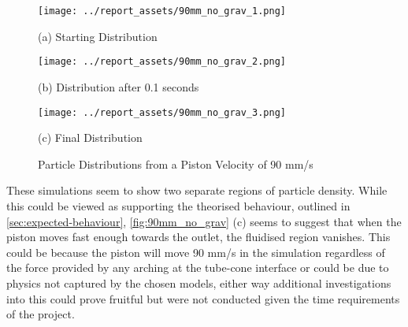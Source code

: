 \begin{figure}[htbp]
    \centering

    \begin{minipage}{0.32\textwidth}
        \centering
        \texttt{[image: ../report\_assets/90mm\_no\_grav\_1.png]}
        \caption*{(a) Starting Distribution}
    \end{minipage}
    \hfill
    \begin{minipage}{0.32\textwidth}
        \centering
        \texttt{[image: ../report\_assets/90mm\_no\_grav\_2.png]}
        \caption*{(b) Distribution after 0.1 seconds}
    \end{minipage}
    \hfill
    \begin{minipage}{0.32\textwidth}
        \centering
        \texttt{[image: ../report\_assets/90mm\_no\_grav\_3.png]}
        \caption*{(c) Final Distribution}
    \end{minipage}
    \caption{Particle Distributions from a Piston Velocity of 90 mm/s}

\end{figure}\label{fig:90mm_no_grav}
These simulations seem to show two separate regions of particle density. While this could be viewed as supporting the theorised behaviour, outlined in \autoref{sec:expected-behaviour}, \autoref{fig:90mm_no_grav} (c) seems to suggest that when the piston moves fast enough towards the outlet, the fluidised region vanishes. This could be because the piston will move 90 mm/s in the simulation regardless of the force provided by any arching at the tube-cone interface or could be due to physics not captured by the chosen models, either way additional investigations into this could prove fruitful but were not conducted given the time requirements of the project.

